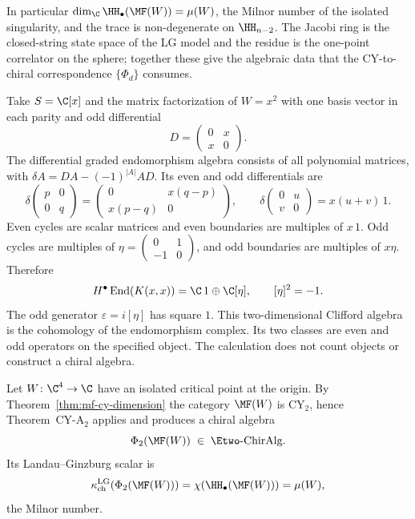 In particular $\dim_{\C} \HH_{\bullet}(\MF(W)) = \mu(W)$, the Milnor number of the isolated singularity, and the trace is non-degenerate on $\HH_{n-2}$. The Jacobi ring is the closed-string state space of the LG model and the residue is the one-point correlator on the sphere; together these give the algebraic data that the CY-to-chiral correspondence $\{\Phi_d\}$ consumes.

\begin{example}
\label{ex:mf-quadratic}
Take $S=\C[x]$ and the matrix factorization of $W=x^2$ with one
basis vector in each parity and odd differential
\[
 D=\begin{pmatrix}0&x\\x&0\end{pmatrix}.
\]
The differential graded endomorphism algebra consists of all
polynomial matrices, with $\delta A=DA-(-1)^{|A|}AD$.
Its even and odd differentials are
\[
 \delta\begin{pmatrix}p&0\\0&q\end{pmatrix}
 =\begin{pmatrix}0&x(q-p)\\x(p-q)&0\end{pmatrix},\qquad
 \delta\begin{pmatrix}0&u\\v&0\end{pmatrix}=x(u+v)\,1.
\]
Even cycles are scalar matrices and even boundaries are multiples
of $x\,1$. Odd cycles are multiples of
$\eta=\left(\begin{smallmatrix}0&1\\-1&0\end{smallmatrix}\right)$,
and odd boundaries are multiples of $x\eta$. Therefore
\[
 H^\bullet\operatorname{End}(K(x,x))
   =\C\,1\oplus\C[\eta],\qquad [\eta]^2=-1.
\]
The odd generator $\varepsilon=i[\eta]$ has square $1$.
This two-dimensional Clifford algebra is the cohomology of the
endomorphism complex. Its two classes are even and odd operators
on the specified object. The calculation does not count objects
or construct a chiral algebra.
\end{example}

\begin{proposition}[\texorpdfstring{$\Phi_2(\MF(W))$}{Phi-2(MF(W))} for \texorpdfstring{$n = 4$}{n = 4}]
\label{prop:mf-phi-input}
Let $W \colon \C^4 \to \C$ have an isolated critical point at the origin. By Theorem~\ref{thm:mf-cy-dimension} the category $\MF(W)$ is CY$_2$, hence Theorem~CY-A$_2$ applies and produces a chiral algebra
\[
 \Phi_2(\MF(W)) \;\in\; \Etwo\text{-}\mathrm{ChirAlg} .
\]
Its Landau--Ginzburg scalar is
\[
 \kappa_{\mathrm{ch}}^{\mathrm{LG}}(\Phi_2(\MF(W))) =
 \chi(\HH_\bullet(\MF(W))) = \mu(W),
\]
the Milnor number.
\end{proposition}

